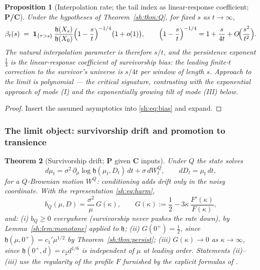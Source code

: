 \documentclass[11pt]{article}
\numberwithin{equation}{section}
\theoremstyle{plain}
\newtheorem{theorem}{Theorem}[section]
\newtheorem{proposition}[theorem]{Proposition}
\theoremstyle{definition}
\theoremstyle{remark}
\newcommand{\one}{\mathbf{1}}
\newcommand{\hm}{\mathfrak{h}}
\begin{document}
\begin{proposition}[Interpolation rate; the tail index as linear-response
coefficient; \textbf{P/C}]\label{sh:prop:rate}
Under the hypotheses of Theorem~\ref{sh:thm:Q}, for fixed $s$ as
$t\to\infty$,
\begin{equation}\label{sh:eq:rate-interp}
\beta_t(s)\;=\;\one_{\{\tau>s\}}\,\frac{\hm(X_s)}{\hm(X_0)}
\Bigl(1-\frac st\Bigr)^{-1/4}\bigl(1+o(1)\bigr),
\qquad
\Bigl(1-\frac st\Bigr)^{-1/4}=1+\frac{s}{4t}+O\!\Bigl(\frac{s^2}{t^2}\Bigr).
\end{equation}
The natural interpolation parameter is therefore $s/t$, and the
persistence exponent $\tfrac14$ is the linear-response coefficient of
survivorship bias: the leading finite-$t$ correction to the survivor's
universe is $s/4t$ per window of length $s$. Approach to the limit is
polynomial --- the critical signature, contrasting with the exponential
approach of mode (I) and the exponentially growing tilt of mode (III)
below.
\end{proposition}

\begin{proof}
Insert the assumed asymptotics into \eqref{sh:eq:bias} and expand.
\end{proof}

\subsubsection{The limit object: survivorship drift and promotion to
transience}\label{sh:subsub:promotion}

\begin{theorem}[Survivorship drift; \textbf{P} given \textbf{C} inputs]
\label{sh:thm:drift}
Under $Q$ the state solves
\begin{equation}\label{sh:eq:Qsde}
d\mu_t=\sigma^2\,\partial_\mu\log\hm(\mu_t,D_t)\,dt+\sigma\,dW^Q_t,
\qquad dD_t=\mu_t\,dt,
\end{equation}
for a $Q$-Brownian motion $W^Q$: conditioning adds drift only in the
noisy coordinate. With the representation \eqref{sh:eq:harm},
\begin{equation}\label{sh:eq:G}
b_Q(\mu,D)=\frac{\sigma^2}{\mu}\,G(\kappa),
\qquad
G(\kappa):=\frac12-3\kappa\,\frac{F'(\kappa)}{F(\kappa)},
\end{equation}
and: \emph{(i)} $b_Q\ge0$ everywhere (survivorship never pushes the rate
down), by Lemma~\ref{sh:lem:monotone} applied to $\hm$;
\emph{(ii)} $G(0^+)=\tfrac12$, since
$\hm(\mu,0^+)=c_1'\mu^{1/2}$ by Theorem~\ref{sh:thm:persist};
\emph{(iii)} $G(\kappa)\to0$ as $\kappa\to\infty$, since
$\hm(0^+,d)=c_2 d^{1/6}$ is independent of $\mu$ at leading order.
Statements (ii)--(iii) use the regularity of the profile $F$ furnished by
the explicit formulas of \cite{GJW99}.
\end{theorem}
\end{document}
